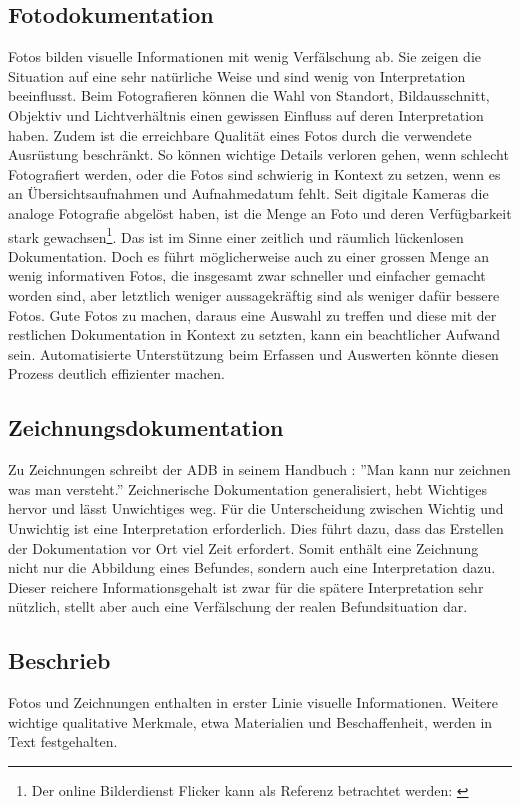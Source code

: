 		\subsection{Fotodokumentation}
			Fotos bilden visuelle Informationen mit wenig Verfälschung ab. Sie zeigen die Situation auf eine sehr natürliche Weise und sind wenig von Interpretation beeinflusst.
			Beim Fotografieren können die Wahl von Standort, Bildausschnitt, Objektiv und Lichtverhältnis einen gewissen Einfluss auf deren Interpretation haben. Zudem ist die erreichbare Qualität eines Fotos durch die verwendete Ausrüstung beschränkt.
			So können wichtige Details verloren gehen, wenn schlecht Fotografiert werden, oder die Fotos sind schwierig in Kontext zu setzen, wenn es an Übersichtsaufnahmen und Aufnahmedatum fehlt.
			Seit digitale Kameras die analoge Fotografie abgelöst haben, ist die Menge an Foto und deren Verfügbarkeit stark gewachsen\footnote{Der online Bilderdienst Flicker kann als Referenz betrachtet werden: \cite{flickr:number}}. Das ist im Sinne einer zeitlich und räumlich lückenlosen Dokumentation.
			Doch es führt möglicherweise auch zu einer grossen Menge an wenig informativen Fotos, die insgesamt zwar schneller und einfacher gemacht worden sind, aber letztlich weniger aussagekräftig sind als weniger dafür bessere Fotos.
			Gute Fotos zu machen, daraus eine Auswahl zu treffen und diese mit der restlichen Dokumentation in Kontext zu setzten, kann ein beachtlicher Aufwand sein.
			Automatisierte Unterstützung beim Erfassen und Auswerten könnte diesen Prozess deutlich effizienter machen.

		\subsection{Zeichnungsdokumentation}
			Zu Zeichnungen schreibt der ADB in seinem Handbuch : ''Man kann nur zeichnen was man versteht.''
			Zeichnerische Dokumentation generalisiert, hebt Wichtiges hervor und lässt Unwichtiges weg. Für die Unterscheidung zwischen Wichtig und Unwichtig ist eine Interpretation erforderlich.
			Dies führt dazu, dass das Erstellen der Dokumentation vor Ort viel Zeit erfordert. Somit enthält eine Zeichnung nicht nur die Abbildung eines Befundes, sondern auch eine Interpretation dazu. Dieser reichere Informationsgehalt ist zwar für die spätere Interpretation sehr nützlich, stellt aber auch eine Verfälschung der realen Befundsituation dar.
			
		\subsection{Beschrieb}
			Fotos und Zeichnungen enthalten in erster Linie visuelle Informationen. Weitere wichtige qualitative Merkmale, etwa Materialien und Beschaffenheit, werden in Text festgehalten.
		
